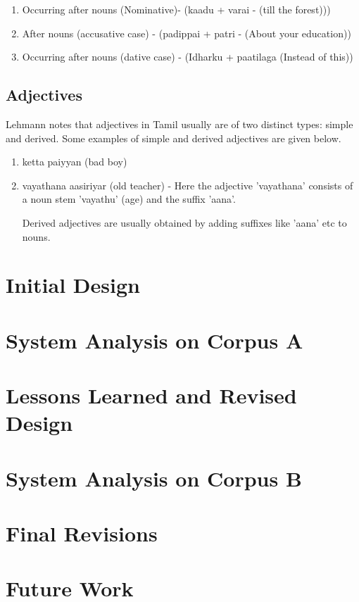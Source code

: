 \documentclass[11pt,letterpaper]{article}
\begin{document}
\begin{enumerate}
 \item Occurring after nouns (Nominative)- (kaadu + varai - (till the forest)))
 \item After nouns (accusative case) - (padippai + patri - (About your education))
 \item Occurring after nouns (dative case) - (Idharku + paatilaga (Instead of this))
 
\end{enumerate}

\subsection{Adjectives}
Lehmann notes that adjectives in Tamil usually are of two distinct types: simple and derived. Some examples of simple
and derived adjectives are given below.

\begin{enumerate}
 \item ketta paiyyan (bad boy)
 \item vayathana aasiriyar (old teacher) - Here the adjective 'vayathana' consists of a noun stem 'vayathu' (age) and the suffix
 'aana'. 
 
Derived adjectives are usually obtained by adding suffixes like 'aana' etc to nouns.
\end{enumerate}

\section{Initial Design}

\section{System Analysis on Corpus A}

\section{Lessons Learned and Revised Design}

\section{System Analysis on Corpus B}

\section{Final Revisions}

\section{Future Work}




\label{lastpage}
\end{document}
